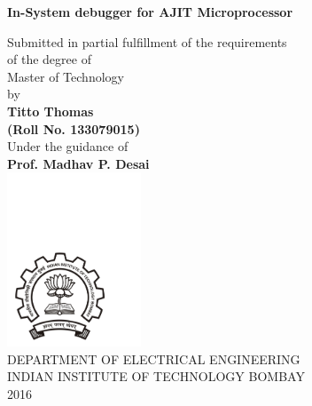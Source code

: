 

\begin{titlepage}
	\begin{center}
		\textbf{\Large{In-System debugger for AJIT Microprocessor}  }
		
		\vspace{0.8cm}
		\large{Submitted in partial fulfillment of the requirements}\\
		\vspace{0.6cm}
		\large{of  the degree of}\\
		\vspace{0.6cm}
		\large{Master of Technology}\\
		\vspace{0.6cm}
		\large{by}\\
		\vspace{0.6cm}
		\textbf{\large{Titto Thomas}}\\
		\textbf{\large{(Roll No. 133079015})}\\
		\vspace{1.1cm}
		\large{Under the guidance of}\\
		\vspace{0.3cm}
		\textbf{\large{Prof. Madhav P. Desai}}\\
		\vspace{0.8cm}
		\hspace{1cm}
		\includegraphics[width=0.3\textwidth]{TitlePage/figs/logo}\\
		\vspace{1.3cm}
		DEPARTMENT OF ELECTRICAL ENGINEERING\\
		INDIAN INSTITUTE OF TECHNOLOGY BOMBAY\\
		2016        
	\end{center}
\end{titlepage}

\pagebreak
\thispagestyle{titlepages}

